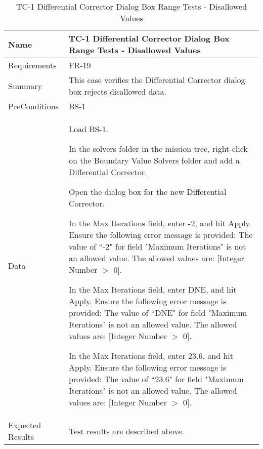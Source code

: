 

\begin{table}[htbp!]
\centering
      \begin{tabular}{|p{1.05 in} |p{4.75 in} |}
      \hline
         \rowcolor[rgb]{0.8,0.8,0.8} Name & TC-1 Differential Corrector Dialog Box Range Tests - Disallowed Values\\
         \hline
         Requirements & FR-19\\  \hline
         Summary &
         This case verifies the Differential Corrector dialog box rejects disallowed data.
         \\     \hline
         PreConditions & BS-1\\     \hline
         Data &
         \begin{compactenum}
             \item Load BS-1.
             \item In the solvers folder in the mission tree, right-click on the Boundary Value Solvers folder and add a Differential Corrector.
             \item Open the dialog box for the new Differential Corrector.
             \item In the Max Iterations field, enter -2, and hit Apply.  Ensure the following error message 
             is provided: The value of ``-2" for field "Maximum Iterations" is not an allowed value. The allowed values are: [Integer Number $>$ 0].
             \item In the Max Iterations field, enter DNE, and hit Apply.  Ensure the following error message
             is provided: The value of ``DNE" for field "Maximum Iterations" is not an allowed value. The allowed values are: [Integer Number $>$ 0].
             \item In the Max Iterations field, enter 23.6, and hit Apply.  Ensure the following error message
             is provided: The value of ``23.6" for field "Maximum Iterations" is not an allowed value. The allowed values are: [Integer Number $>$ 0].
         \end{compactenum}
         \\ \hline
         Expected Results & Test results are described above.\\
      \hline
      \end{tabular}
      \label{Table:TC-1}
      \caption{TC-1 Differential Corrector Dialog Box Range Tests - Disallowed Values}
\end{table} 